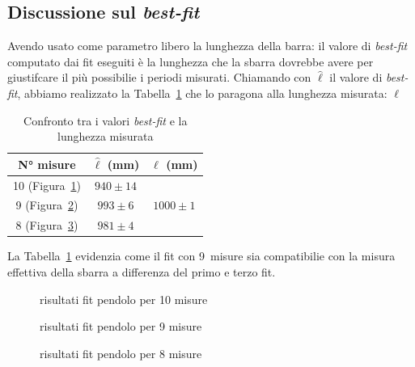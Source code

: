 \documentclass[a4paper,12pt]{article}
\begin{document}
\subsection{Discussione sul \textit{best-fit}}
Avendo usato come parametro libero la lunghezza della barra: il valore di \textit{best-fit} computato dai fit eseguiti è la lunghezza che la sbarra dovrebbe avere per giustifcare il più possibilie i periodi misurati. Chiamando con $\hat{\ell}$ il valore di \textit{best-fit}, abbiamo realizzato la Tabella~\ref{tab:best_fit_vs_misurat} che lo paragona alla lunghezza misurata: $\ell$

\begin{table}[h!]
    \centering
    \begin{tabular}{c|c|c}
         N° misure & $\hat{\ell}$ (mm) & $\ell$ (mm)\\
         \toprule
         10 (Figura~\ref{fig:10musre}) & $940 \pm 14$ &\\
         9 (Figura~\ref{fig:9misure}) & $993\pm6$ & $1000\pm1$ \\
         8 (Figura~\ref{fig:8misure}) & $981\pm4$&
    \end{tabular}
    \caption{Confronto tra i valori \textit{best-fit} e la lunghezza misurata}
    \label{tab:best_fit_vs_misurat}
\end{table}

La Tabella~\ref{tab:best_fit_vs_misurat} evidenzia come il fit con 9~misure sia compatibilie con la misura effettiva della sbarra a differenza del primo e terzo fit.

\begin{figure}
    \centering
    \sffamily
    \resizebox{0.85\textwidth}{!}{%
        
    }
    \caption{risultati fit pendolo per 10 misure}
    \label{fig:10musre}
\end{figure}

\begin{figure}
    \centering
    \sffamily
    \resizebox{0.85\textwidth}{!}{%
        
    }
    \caption{risultati fit pendolo per 9 misure}
    \label{fig:9misure}
\end{figure}

\begin{figure}
    \centering
    \resizebox{0.85\textwidth}{!}{%
        
    }
    \caption{risultati fit pendolo per 8 misure}
    \label{fig:8misure}
\end{figure}
\end{document}
